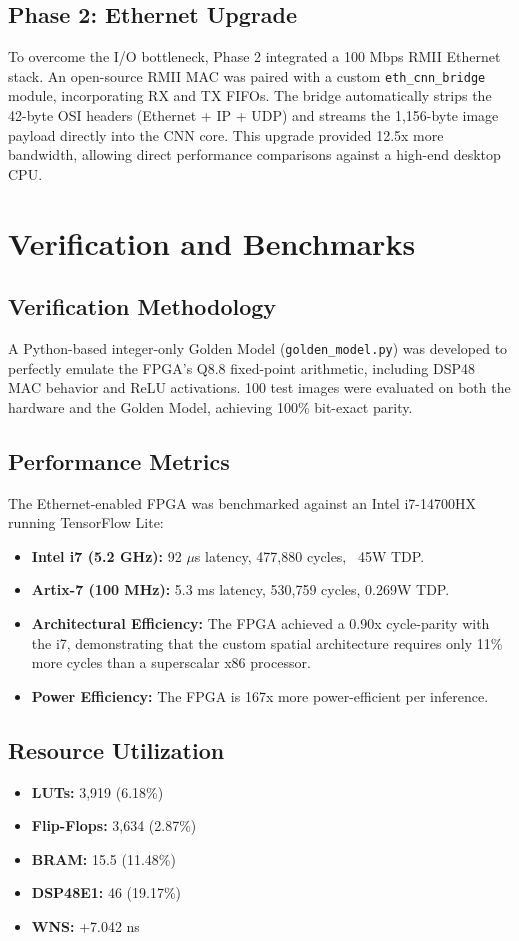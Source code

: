 \documentclass[12pt,a4paper]{article}
\begin{document}
\subsection{Phase 2: Ethernet Upgrade}
To overcome the I/O bottleneck, Phase 2 integrated a 100 Mbps RMII Ethernet stack. An open-source RMII MAC was paired with a custom \texttt{eth\_cnn\_bridge} module, incorporating RX and TX FIFOs. The bridge automatically strips the 42-byte OSI headers (Ethernet + IP + UDP) and streams the 1,156-byte image payload directly into the CNN core. This upgrade provided 12.5x more bandwidth, allowing direct performance comparisons against a high-end desktop CPU.

\section{Verification and Benchmarks}

\subsection{Verification Methodology}
A Python-based integer-only Golden Model (\texttt{golden\_model.py}) was developed to perfectly emulate the FPGA's Q8.8 fixed-point arithmetic, including DSP48 MAC behavior and ReLU activations. 100 test images were evaluated on both the hardware and the Golden Model, achieving 100\% bit-exact parity.

\subsection{Performance Metrics}
The Ethernet-enabled FPGA was benchmarked against an Intel i7-14700HX running TensorFlow Lite:
\begin{itemize}
    \item \textbf{Intel i7 (5.2 GHz):} 92 $\mu$s latency, 477,880 cycles, ~45W TDP.
    \item \textbf{Artix-7 (100 MHz):} 5.3 ms latency, 530,759 cycles, 0.269W TDP.
    \item \textbf{Architectural Efficiency:} The FPGA achieved a 0.90x cycle-parity with the i7, demonstrating that the custom spatial architecture requires only 11\% more cycles than a superscalar x86 processor.
    \item \textbf{Power Efficiency:} The FPGA is 167x more power-efficient per inference.
\end{itemize}

\subsection{Resource Utilization}
\begin{itemize}
    \item \textbf{LUTs:} 3,919 (6.18\%)
    \item \textbf{Flip-Flops:} 3,634 (2.87\%)
    \item \textbf{BRAM:} 15.5 (11.48\%)
    \item \textbf{DSP48E1:} 46 (19.17\%)
    \item \textbf{WNS:} +7.042 ns
\end{itemize}
\end{document}
